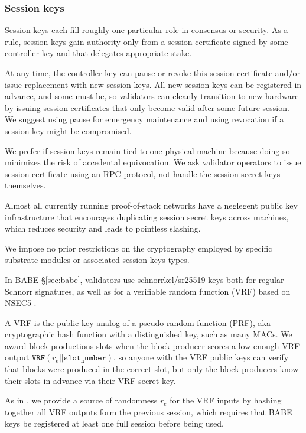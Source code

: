 \subsubsection{Session keys}\label{sec:session_keys}

Session keys each fill roughly one particular role in consensus or security.  As a rule, session keys gain authority only from a session certificate signed by some controller key and that delegates appropriate stake.  

At any time, the controller key can pause or revoke this session certificate and/or issue replacement with new session keys.  All new session keys can be registered in advance, and some must be, so validators can cleanly transition to new hardware by issuing session certificates that only become valid after some future session.  We suggest using pause for emergency maintenance and using revocation if a session key might be compromised.  

We prefer if session keys remain tied to one physical machine because doing so minimizes the risk of accedental equivocation.  We ask validator operators to issue session certificate using an RPC protocol, not handle the session secret keys themselves.  

Almost all currently running proof-of-stack networks have a neglegent public key infrastructure that encourages duplicating session secret keys across machines, which reduces security and leads to pointless slashing.

\smallskip

We impose no prior restrictions on the cryptography employed by specific substrate modules or associated session keys types.  

In BABE \S\ref{sec:babe}, validators use schnorrkel/sr25519 keys both for regular Schnorr signatures, as well as for a verifiable random function (VRF) based on NSEC5 \cite{NSEC5}.  

A VRF is the public-key analog of a pseudo-random function (PRF), aka cryptographic hash function with a distinguished key, such as many MACs.  We award block productions slots when the block producer scores a low enough VRF output $\mathtt{VRF}(r_e || \mathtt{slot_number} )$, so anyone with the VRF public keys can verify that blocks were produced in the correct slot, but only the block producers know their slots in advance via their VRF secret key.

As in \cite{Praos}, we provide a source of randomness $r_e$ for the VRF inputs by hashing together all VRF outputs form the previous session, which requires that BABE keys be registered at least one full session before being used.

